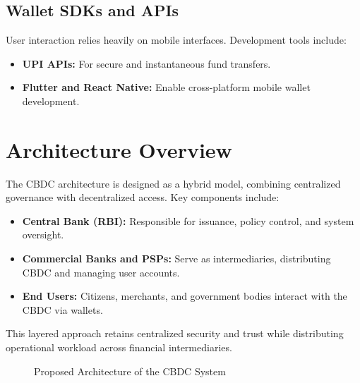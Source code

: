 \subsection*{Wallet SDKs and APIs}
User interaction relies heavily on mobile interfaces. Development tools include:
\begin{itemize}
    \item \textbf{UPI APIs:} For secure and instantaneous fund transfers.
    \item \textbf{Flutter and React Native:} Enable cross-platform mobile wallet development.
\end{itemize}

\section{Architecture Overview}
The CBDC architecture is designed as a hybrid model, combining centralized governance with decentralized access. Key components include:
\begin{itemize}
    \item \textbf{Central Bank (RBI):} Responsible for issuance, policy control, and system oversight.
    \item \textbf{Commercial Banks and PSPs:} Serve as intermediaries, distributing CBDC and managing user accounts.
    \item \textbf{End Users:} Citizens, merchants, and government bodies interact with the CBDC via wallets.
\end{itemize}

This layered approach retains centralized security and trust while distributing operational workload across financial intermediaries.

\begin{figure}[H]
\centering
\caption{Proposed Architecture of the CBDC System}
\label{fig:chp5-architecture}
\end{figure}

